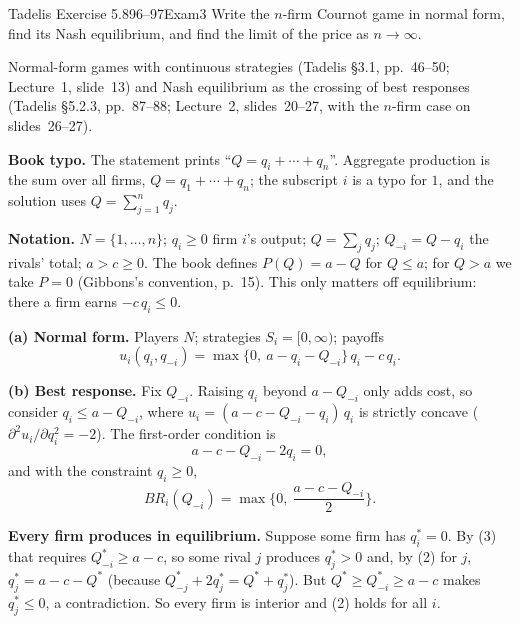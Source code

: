 \begin{exsol}{Tadelis Exercise 5.8}{96--97}{Exam}{3}
\asked Write the $n$-firm Cournot game in normal form, find its Nash equilibrium, and find the limit of the price as $n \to \infty$.

\method Normal-form games with continuous strategies (Tadelis \S3.1, pp.~46--50; Lecture~1,
slide~13) and Nash equilibrium as the crossing of best responses (Tadelis
\S5.2.3, pp.~87--88; Lecture~2, slides~20--27, with the $n$-firm case on slides~26--27).

\solution
\textbf{Book typo.} The statement prints ``$Q = q_i + \cdots + q_n$''. Aggregate production is the
sum over all firms, $Q = q_1 + \cdots + q_n$; the subscript $i$ is a typo for $1$, and the solution
uses $Q = \sum_{j=1}^n q_j$.

\textbf{Notation.} $N = \{1, \dots, n\}$; $q_i \ge 0$ firm $i$'s output; $Q = \sum_j q_j$;
$Q_{-i} = Q - q_i$ the rivals' total; $a > c \ge 0$. The book defines $P(Q) = a - Q$ for $Q \le a$;
for $Q > a$ we take $P = 0$ (Gibbons's convention, p.~15). This only matters off equilibrium:
there a firm earns $-c\,q_i \le 0$.

\textbf{(a) Normal form.} Players $N$; strategies $S_i = [0, \infty)$; payoffs
\[
  u_i(q_i, q_{-i}) = \max\{0,\ a - q_i - Q_{-i}\}\, q_i - c\, q_i . \tag{1}
\]

\textbf{(b) Best response.} Fix $Q_{-i}$. Raising $q_i$ beyond $a - Q_{-i}$ only adds cost, so
consider $q_i \le a - Q_{-i}$, where $u_i = (a - c - Q_{-i} - q_i)\,q_i$ is strictly concave
($\partial^2 u_i/\partial q_i^2 = -2$). The first-order condition is
\[
  a - c - Q_{-i} - 2q_i = 0, \tag{2}
\]
and with the constraint $q_i \ge 0$,
\[
  BR_i(Q_{-i}) = \max\Big\{0,\ \frac{a - c - Q_{-i}}{2}\Big\}. \tag{3}
\]

\textbf{Every firm produces in equilibrium.} Suppose some firm has $q_i^* = 0$. By (3) that
requires $Q_{-i}^* \ge a - c$, so some rival $j$ produces $q_j^* > 0$ and, by (2) for $j$,
$q_j^* = a - c - Q^*$ (because $Q_{-j}^* + 2q_j^* = Q^* + q_j^*$). But $Q^* \ge Q_{-i}^* \ge a - c$
makes $q_j^* \le 0$, a contradiction. So every firm is interior and (2) holds for all $i$.


\end{exsol}
